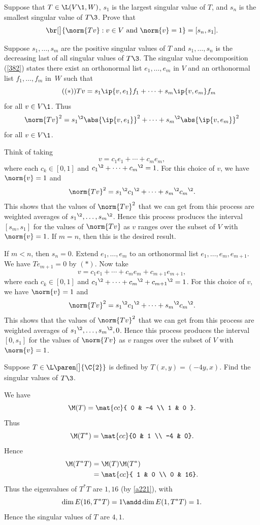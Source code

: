 \exercise
Suppose that $T \in \L(V\1, W)$, $s_1$ is the largest singular value of $T$, and $s_n$ is the smallest singular value of $T\3$. Prove that\label{3interval}
\[
\br[\big]{ \norm{Tv} : v \in V \text{ and } \norm{v} = 1 } = [s_n, s_1].
\]
\exercisedisplayend

\begin{Solution}
Suppose $s_1, \dots, s_m$ are the positive singular values of $T$ and $s_1, \dots, s_n$ is the decreasing last of all singular values of $T\3$.  The singular value decomposition (\ref{382}) states there exist an orthonormal list $e_1, \dots, e_m$ in $V$ and an orthonormal list $f_1, \dots, f_m$ in~$W$ such that
\[ \tag{$(*)$}
Tv = s_1 \ip{v, e_1} f_1 + \dots + s_m \ip{v, e_m} f_m
\]
for all $v \in V\1$. Thus
\[
\norm{Tv}^2 = {s_1}^{\2} \abs{\ip{v,e_1}}^2 + \cdots + {s_m}^{\2} \abs{\ip{v,e_m}}^2
\]
for all $v \in V\1$.

Think of taking
\[
v = c_1 e_1 + \cdots + c_m e_m,
\]
where each $c_k \in [0, 1]$ and ${c_1}^{\2} + \cdots + {c_m}^{\2} = 1$. For this choice of $v$, we have $\norm{v} = 1$ and
\[
\norm{Tv}^2 = {s_1}^{\2} {c_1}^{\2} + \cdots + {s_m}^{\2} {c_m}^{\2}.
\]
This shows that the values of $\norm{Tv}^2$ that we can get from this process are weighted averages of ${s_1}^{\2}, \ldots, {s_m}^{\2}$. Hence this process produces the interval $[s_m, s_1]$ for the values of $\norm{Tv}$ as $v$ ranges over the subset of $V$ with
$\norm{v} = 1$. If $m = n$, then this is the desired result.

If $m < n$, then $s_n = 0$. Extend $e_1, \ldots, e_m$ to an orthonormal list $e_1, \ldots, e_m, e_{m+1}$. We have $Te_{m+1} = 0$ by $(*)$. Now take
\[
v = c_1 e_1 + \cdots + c_m e_m + c_{m+1} e_{m+1},
\]
where each $c_k \in [0, 1]$ and ${c_1}^{\2} + \cdots + {c_m}^{\2} + {c_{m+1}}^{\2}= 1$. For this choice of $v$, we have $\norm{v} = 1$ and
\[
\norm{Tv}^2 = {s_1}^{\2} {c_1}^{\2} + \cdots + {s_m}^{\2} {c_m}^{\2}.
\]
This shows that the values of $\norm{Tv}^2$ that we can get from this process are weighted averages of ${s_1}^{\2}, \ldots, {s_m}^{\2}, 0$. Hence this process produces the interval $[0, s_1]$ for the values of $\norm{Tv}$ as $v$ ranges over the subset of $V$ with
$\norm{v} = 1$.
\end{Solution}

\exercise
Suppose $T \in \L\paren[\big]{\C{2}}$ is defined by $T(x, y) = (-4y, x)$. Find the singular values of $T\3$.

\begin{Solution}
We have
\[
\M(T) = \mat{cc}{
0 & -4 \\
1 & 0 }.
\]
Thus
\[
\M(T^*) = \mat{cc}
{0 & 1 \\
-4 & 0}.
\]
Hence
\begin{align*}
\M(T^* T) &= \M(T) \M(T^*) \\
&= \mat{cc}{
1 & 0 \\
0 & 16}.
\end{align*}
Thus the eigenvalues of $T^* T$ are $1, 16$ (by \ref{a221}), with
\[
\dim E(16, T^*T) = 1 \andd \dim E(1, T^*T) = 1.
\]
Hence the singular values of $T$ are $4, 1$.
\end{Solution}

